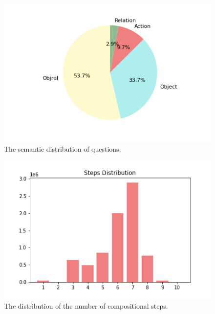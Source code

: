 \documentclass[10pt,twocolumn,letterpaper]{article}
\begin{document}
\begin{figure}[t]
\begin{center}
\includegraphics[width=0.8\linewidth]{Figures/sem_dist.png}
\end{center}
   \caption{The semantic distribution of questions.}
\label{semantics}
\end{figure}


\begin{figure}[t]
\begin{center}
\includegraphics[width=0.8\linewidth]{Figures/steps_dist.png}
\end{center}
   \caption{The distribution of the number of compositional steps.}
\label{steps}
\end{figure}



\end{document}
